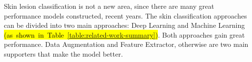 \documentclass[sensors,article,accept,pdftex,moreauthors]{Definitions/mdpi}
\begin{document}
	
	{Skin lesion classification is not a new area, since there are many great performance models constructed, recent years. The skin classification approaches can be divided into two main approaches: Deep Learning and Machine Learning \hl{\mbox{(as shown in Table \ref{table:related-work-summary})}}. Both approaches gain great performance. Data Augmentation and Feature Extractor, otherwise are two main supporters that make the model better.
		\begin{table}[H]
\caption{{Summary of related} %
works.}
\label{table:related-work-summary}


\end{table}}
\end{document}
